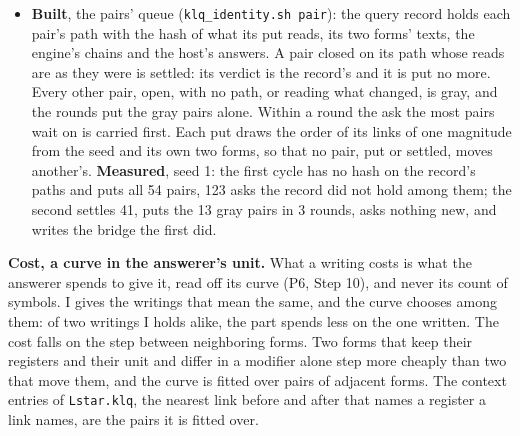 \begin{itemize}
\item \textbf{Built}, the pairs' queue (\texttt{klq\_\allowbreak{}identity.\allowbreak{}sh pair}): the query record holds each pair's path with the hash of what its put reads, its two forms' texts, the engine's chains and the host's answers. A pair closed on its path whose reads are as they were is settled: its verdict is the record's and it is put no more. Every other pair, open, with no path, or reading what changed, is gray, and the rounds put the gray pairs alone. Within a round the ask the most pairs wait on is carried first. Each put draws the order of its links of one magnitude from the seed and its own two forms, so that no pair, put or settled, moves another's. \textbf{Measured}, seed 1: the first cycle has no hash on the record's paths and puts all 54 pairs, 123 asks the record did not hold among them; the second settles 41, puts the 13 gray pairs in 3 rounds, asks nothing new, and writes the bridge the first did.
\end{itemize}

\textbf{Cost, a curve in the answerer's unit.} What a writing costs is what the answerer spends to give it, read off its curve (P6, Step 10), and never its count of symbols. I gives the writings that mean the same, and the curve chooses among them: of two writings I holds alike, the part spends less on the one written. The cost falls on the step between neighboring forms. Two forms that keep their registers and their unit and differ in a modifier alone step more cheaply than two that move them, and the curve is fitted over pairs of adjacent forms. The context entries of \texttt{Lstar.\allowbreak{}klq}, the nearest link before and after that names a register a link names, are the pairs it is fitted over.

